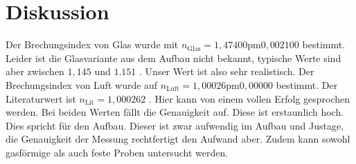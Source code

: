 \section{Diskussion}
Der Brechungsindex von Glas wurde mit $n_\text{Glas}=\si{1,47400\pm0,002100}$ bestimmt. Leider ist die Glasvariante aus dem Aufbau nicht bekannt, typische
 Werte sind aber zwischen $\si{1,145}$ und $\si{1.151}$ \cite{filmetrics}. Unser Wert ist also sehr realistisch.
Der Brechungsindex von Luft wurde auf $n_\text{Luft}=\si{1,00026 \pm 0,00000}$ bestimmt. Der Literaturwert ist $n_\text{Lit}=\si{1,000262}$ \cite{spektrum}. Hier kann von
 einem vollen Erfolg gesprochen werden. Bei beiden Werten fällt die Genauigkeit auf. Diese ist erstaunlich hoch. Dies spricht für den Aufbau. Dieser ist zwar
aufwendig im Aufbau und Justage, die Genauigkeit der Messung rechtfertigt den Aufwand aber. Zudem kann sowohl gasförmige als auch feste Proben untersucht werden.
\label{sec:Diskussion}
